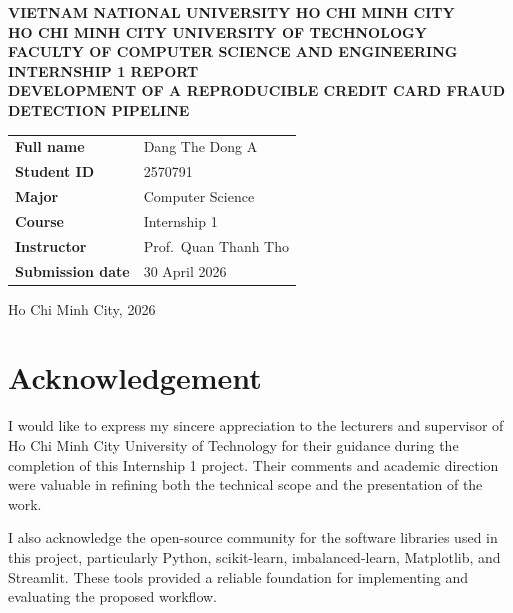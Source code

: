 \documentclass[12pt,a4paper]{report}
\begin{document}
\begin{titlepage}
\begin{center}
{\large \textbf{VIETNAM NATIONAL UNIVERSITY HO CHI MINH CITY}}\\[0.2cm]
{\large \textbf{HO CHI MINH CITY UNIVERSITY OF TECHNOLOGY}}\\[0.2cm]
{\large \textbf{FACULTY OF COMPUTER SCIENCE AND ENGINEERING}}\\[2.0cm]

{\Large \textbf{INTERNSHIP 1 REPORT}}\\[0.8cm]
{\Large \textbf{DEVELOPMENT OF A REPRODUCIBLE CREDIT CARD FRAUD DETECTION PIPELINE}}\\[2.0cm]
\end{center}

\noindent
\begin{tabular}{>{\bfseries}p{4.2cm}p{9.5cm}}
Full name & Dang The Dong A \\
Student ID & 2570791 \\
Major & Computer Science \\
Course & Internship 1 \\
Instructor & Prof.\ Quan Thanh Tho \\
Submission date & 30 April 2026 \\
\end{tabular}

\vfill

\begin{center}
Ho Chi Minh City, 2026
\end{center}
\end{titlepage}


\chapter*{Acknowledgement}
I would like to express my sincere appreciation to the lecturers and supervisor of Ho Chi Minh City University of Technology for their guidance during the completion of this Internship 1 project. Their comments and academic direction were valuable in refining both the technical scope and the presentation of the work.

I also acknowledge the open-source community for the software libraries used in this project, particularly Python, scikit-learn, imbalanced-learn, Matplotlib, and Streamlit. These tools provided a reliable foundation for implementing and evaluating the proposed workflow.
\end{document}
